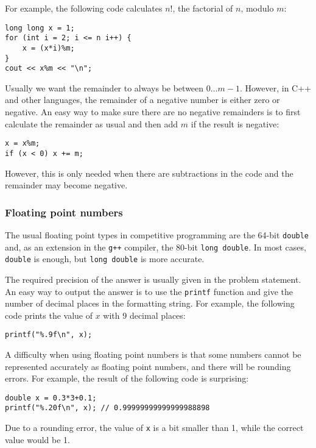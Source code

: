 For example, the following code calculates $n!$,
the factorial of $n$, modulo $m$:
\begin{lstlisting}
long long x = 1;
for (int i = 2; i <= n i++) {
    x = (x*i)%m;
}
cout << x%m << "\n";
\end{lstlisting}

Usually we want the remainder to always
be between $0\ldots m-1$.
However, in C++ and other languages,
the remainder of a negative number
is either zero or negative.
An easy way to make sure there
are no negative remainders is to first calculate
the remainder as usual and then add $m$
if the result is negative:
\begin{lstlisting}
x = x%m;
if (x < 0) x += m;
\end{lstlisting}
However, this is only needed when there
are subtractions in the code and the
remainder may become negative.

\subsubsection{Floating point numbers}


The usual floating point types in
competitive programming are
the 64-bit \texttt{double}
and, as an extension in the \texttt{g++} compiler,
the 80-bit \texttt{long double}.
In most cases, \texttt{double} is enough,
but \texttt{long double} is more accurate.

The required precision of the answer
is usually given in the problem statement.
An easy way to output the answer is to use
the \texttt{printf} function
and give the number of decimal places
in the formatting string.
For example, the following code prints
the value of $x$ with 9 decimal places:

\begin{lstlisting}
printf("%.9f\n", x);
\end{lstlisting}

A difficulty when using floating point numbers
is that some numbers cannot be represented
accurately as floating point numbers,
and there will be rounding errors.
For example, the result of the following code
is surprising:

\begin{lstlisting}
double x = 0.3*3+0.1;
printf("%.20f\n", x); // 0.99999999999999988898
\end{lstlisting}

Due to a rounding error,
the value of \texttt{x} is a bit smaller than 1,
while the correct value would be 1.

